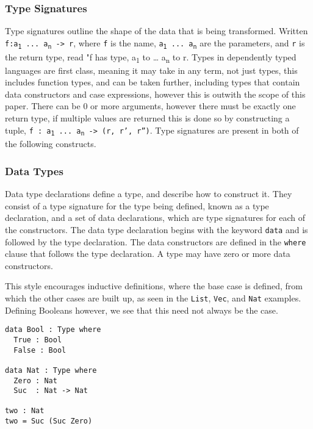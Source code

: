 \documentclass[a4paper]{article}
\begin{document}
\subsubsection{Type Signatures}
\label{sec:org6cd40f9}
Type signatures outline the shape of the data that is being transformed.
Written \texttt{f:a\textsubscript{1} ... a\textsubscript{n} -> r}, where \texttt{f} is the name, \texttt{a\textsubscript{1} ...  a\textsubscript{n}} are
the parameters, and \texttt{r} is the return type, read "f has type, a\textsubscript{1} 
to \ldots{} a\textsubscript{n} to r. Types in dependently typed languages are first class,
meaning it may take in any term, not just types, this includes function
types, and can be taken further, including types that contain data constructors and case expressions, however this is outwith the scope of
this paper. There can be 0 or more arguments,
however there must be exactly one return type, if multiple values are 
returned this is done so by constructing a tuple,
\texttt{f : a\textsubscript{1} ... a\textsubscript{n} -> (r, r', r'')}. Type signatures are present in both
of the following constructs.

\subsubsection{Data Types}
\label{sec:orga233947}
Data type declarations define a type, and describe how to construct it.
They consist of a type signature for the type being 
defined, known as a type declaration, and a set of data declarations, 
which are type signatures for each of the constructors.
The data type declaration begins with the keyword \texttt{data} and is followed by 
the type declaration. The data constructors are defined in the \texttt{where} 
clause that follows the type declaration. A type may have zero or more
data constructors. 

This style encourages inductive definitions, where the base case is 
defined, from which the other cases are built up, as seen in the \texttt{List},
\texttt{Vec}, and \texttt{Nat} examples. Defining Booleans however, we see that this
need not always be the case. 

\begin{center}
\begin{verbatim}
data Bool : Type where
  True : Bool
  False : Bool

data Nat : Type where
  Zero : Nat
  Suc  : Nat -> Nat

two : Nat
two = Suc (Suc Zero)
\end{verbatim}
\end{center}
\end{document}
